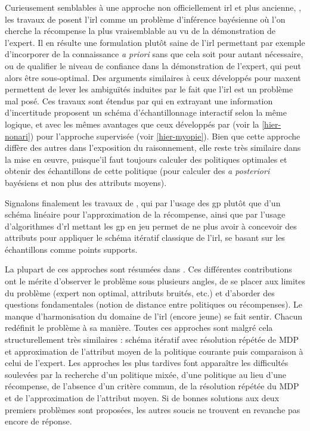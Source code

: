 \documentclass[frenchb,a4paper,justified,notoc]{tufte-book}
\begin{document}
   Curieusement semblables à une approche non officiellement \gls{irl} et plus ancienne, \citep{chajewska2001learning}, les travaux de  \citet{ramachandran2007bayesian} posent l'\gls{irl} comme un problème d'inférence bayésienne où l'on cherche la récompense la plus vraisemblable au vu de la démonstration de l'expert. Il en résulte une formulation plutôt saine de l'\gls{irl} permettant par exemple d'incorporer de la connaissance \emph{a priori} sans que cela soit pour autant nécessaire, ou de qualifier le niveau de confiance dans la démonstration de l'expert, qui peut alors être sous-optimal. Des arguments similaires à ceux développés pour \gls{maxent} permettent de lever les ambiguïtés induites par le fait que l'\gls{irl} est un problème mal posé. Ces travaux sont étendus par \citet{lopes2009active} qui en extrayant une information d'incertitude proposent un schéma d'échantillonnage interactif selon la même logique, et avec les mêmes avantages que ceux développés par \citeauthor{chernova2007confidence} (voir la \autoref{hier-nonari}) pour l'approche supervisée (voir \autoref{hier-myopie}). Bien que cette approche diffère des autres dans l'exposition du raisonnement, elle reste très similaire dans la mise en œuvre, puisque'il faut toujours calculer des politiques optimales et obtenir des échantillons de cette politique (pour calculer des \emph{a posteriori} bayésiens et non plus des attributs moyens). 

   Signalons finalement les travaux de \citet{jin2010gaussian}, qui par l'usage des \gls{gp} plutôt que d'un schéma linéaire pour l'approximation de la récompense, ainsi que par l'usage d'algorithmes d'\gls{rl} mettant les \gls{gp} en jeu \citep{rasmussen2004gaussian,deisenroth2009gaussian} permet de ne plus avoir à concevoir des attributs pour appliquer le schéma itératif classique de l'\gls{irl}, se basant sur les échantillons comme points supports.

   La plupart de ces approches sont résumées dans \citep{neu2009training}. Ces différentes contributions ont le mérite d'observer le problème sous plusieurs angles, de se placer aux limites du problème (expert non optimal, attributs bruités, etc.) et d'aborder des questions fondamentales (notion de distance entre politiques ou récompenses). Le manque d'harmonisation du domaine de l'\gls{irl} (encore jeune) se fait sentir. Chacun redéfinit le problème à sa manière. Toutes ces approches sont malgré cela structurellement très similaires  : schéma itératif avec résolution répétée de MDP et approximation de l'attribut moyen de la politique courante puis comparaison à celui de l'expert. Les approches les plus tardives font apparaître les difficultés soulevées par la recherche d'un politique mixée, d'une politique au lieu d'une récompense, de l'absence d'un critère commun, de la résolution répétée du MDP et de l'approximation de l'attribut moyen. Si de bonnes solutions aux deux premiers problèmes sont proposées, les autres soucis ne trouvent en revanche pas encore de réponse.
   
\end{document}
